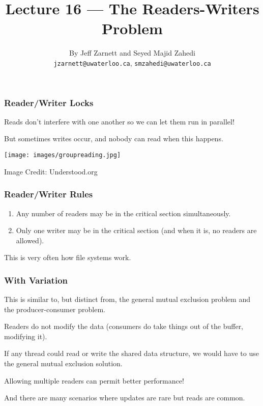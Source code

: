 
\usepackage{multirow}

\title{Lecture 16 --- The Readers-Writers Problem }

\author{By Jeff Zarnett and Seyed Majid Zahedi \\ \small \texttt{jzarnett@uwaterloo.ca}, \texttt{smzahedi@uwaterloo.ca}}
\date{}




\begin{frame}
	\titlepage

\end{frame}

\begin{frame}
	\frametitle{Reader/Writer Locks}
	Reads don't interfere with one another so we can let them run in parallel!

	But sometimes writes occur, and nobody can read when this happens.

	\begin{center}
		\texttt{[image: images/groupreading.jpg]}
	\end{center}
	{\footnotesize \hfill Image Credit: Understood.org}
\end{frame}

\begin{frame}
	\frametitle{Reader/Writer Rules}


	\begin{enumerate}
		\item Any number of readers may be in the critical section simultaneously.
		\item Only one writer may be in the critical section (and when it is, no readers are allowed).
	\end{enumerate}


	This is very often how file systems work.

\end{frame}


\begin{frame}
	\frametitle{With Variation}

	This is similar to, but distinct from, the general mutual exclusion problem and the producer-consumer problem.

	Readers do not modify the data (consumers do take things out of the buffer, modifying it).

	If any thread could read or write the shared data structure, we would have to use the general mutual exclusion solution.

	Allowing multiple readers can permit better performance!

	And there are many scenarios where updates are rare but reads are common.

\end{frame}


